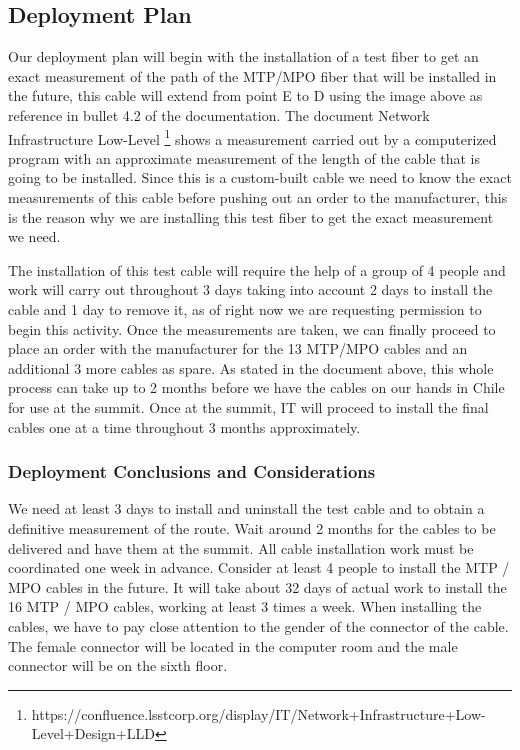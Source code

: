 \newpage
\subsection{Deployment Plan}

  Our deployment plan will begin with the installation of a test fiber to get an exact measurement of the path of the MTP/MPO fiber that will be installed in the future, this cable will extend from point E to D using the image above as reference in bullet 4.2 of the documentation. The document Network Infrastructure Low-Level \footnote[1]{https://confluence.lsstcorp.org/display/IT/Network+Infrastructure+Low-Level+Design+LLD} shows a measurement carried out by a computerized program with an approximate measurement of the length of the cable that is going to be installed. Since this is a custom-built cable we need to know the exact measurements of this cable before pushing out an order to the manufacturer, this is the reason why we are installing this test fiber to get the exact measurement we need. 


  The installation of this test cable will require the help of a group of 4 people and work will carry out throughout 3 days taking into account 2 days to install the cable and 1 day to remove it, as of right now we are requesting permission to begin this activity. Once the measurements are taken, we can finally proceed to place an order with the manufacturer for the 13 MTP/MPO cables and an additional 3 more cables as spare. As stated in the document above, this whole process can take up to 2 months before we have the cables on our hands in Chile for use at the summit. Once at the summit, IT will proceed to install the final cables one at a time throughout 3 months approximately.

\subsubsection{Deployment Conclusions and Considerations}

  We need at least 3 days to install and uninstall the test cable and to obtain a definitive measurement of the route.
  Wait around 2 months for the cables to be delivered and have them at the summit.
  All cable installation work must be coordinated one week in advance.
  Consider at least 4 people to install the MTP / MPO cables in the future.
  It will take about 32 days of actual work to install the 16 MTP / MPO cables, working at least 3 times a week.
  When installing the cables, we have to pay close attention to the gender of the connector of the cable.  The female connector will be located in the computer room and the male connector will be on the sixth floor.
\newpage







